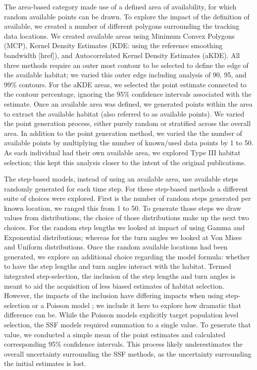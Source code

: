 \documentclass[10pt,a4paper]{article}
\begin{document}
The area-based category made use of a defined area of availability, for which random available points can be drawn.
To explore the impact of the definition of available, we created a number of different polygons surrounding the tracking data locations.
We created available areas using Minimum Convex Polygons (MCP), Kernel Density Estimates (KDE: using the reference smoothing bandwidth {[}href{]}), and Autocorrelated Kernel Density Estimates (aKDE).
All three methods require an outer most contour to be selected to define the edge of the available habitat; we varied this outer edge including analysis of 90, 95, and 99\% contours.
For the aKDE areas, we selected the point estimate connected to the contour percentage, ignoring the 95\% confidence intervals associated with the estimate.
Once an available area was defined, we generated points within the area to extract the available habitat (also referred to as available points).
We varied the point generation process, either purely random or stratified across the overall area.
In addition to the point generation method, we varied the the number of available points by multiplying the number of known/used data points by 1 to 50.
As each individual had their own available area, we explored Type III habitat selection; this kept this analysis closer to the intent of the original publications.

The step-based models, instead of using an available area, use available steps randomly generated for each time step.
For these step-based methods a different suite of choices were explored.
First is the number of random steps generated per known location, we ranged this from 1 to 50.
To generate those steps we draw values from distributions, the choice of those distributions make up the next two choices.
For the random step lengths we looked at impact of using Gamma and Exponential distributions; whereas for the turn angles we looked at Von Mises and Uniform distributions.
Once the random available locations had been generated, we explore an additional choice regarding the model formula: whether to have the step lengths and turn angles interact with the habitat.
Termed integrated step-selection, the inclusion of the step lengths and turn angles is meant to aid the acquisition of less biased estimates of habitat selection.
However, the impacts of the inclusion have differing impacts when using step-selection or a Poisson model ; we include it here to explore how dramatic that difference can be.
While the Poisson models explicitly target population level selection, the SSF models required summation to a single value.
To generate that value, we conducted a simple mean of the point estimates and calculated corresponding 95\% confidence intervals.
This process likely underestimates the overall uncertainty surrounding the SSF methods, as the uncertainty surrounding the initial estimates is lost.
\end{document}
